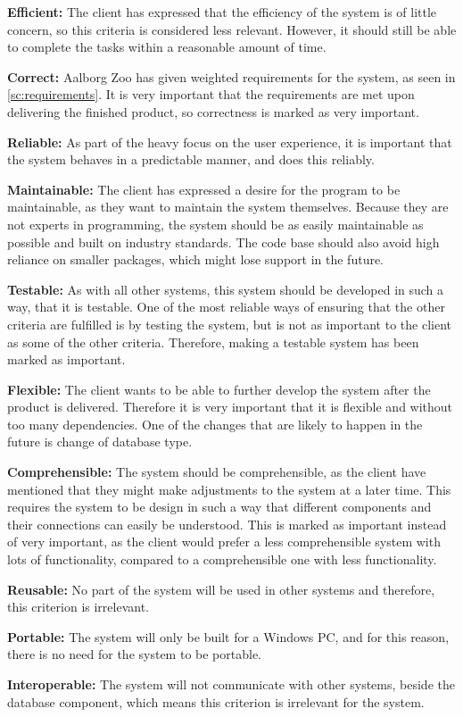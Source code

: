 \textbf{Efficient:} The client has expressed that the efficiency of the system is of little concern, so this criteria is considered less relevant. However, it should still be able to complete the tasks within a reasonable amount of time.

\textbf{Correct:} Aalborg Zoo has given weighted requirements for the system, as seen in \autoref{sc:requirements}. It is very important that the requirements are met upon delivering the finished product, so correctness is marked as very important.

\textbf{Reliable:} As part of the heavy focus on the user experience, it is important that the system behaves in a predictable manner, and does this reliably.

\textbf{Maintainable:} The client has expressed a desire for the program to be maintainable, as they want to maintain the system themselves. Because they are not experts in programming, the system should be as easily maintainable as possible and built on industry standards. The code base should also avoid high reliance on smaller packages, which might lose support in the future.

\textbf{Testable:} As with all other systems, this system should be developed in such a way, that it is testable. One of the most reliable ways of ensuring that the other criteria are fulfilled is by testing the system, but is not as important to the client as some of the other criteria. Therefore, making a testable system has been marked as important.

\textbf{Flexible:} The client wants to be able to further develop the system after the product is delivered. Therefore it is very important that it is flexible and without too many dependencies. One of the changes that are likely to happen in the future is change of database type.

\textbf{Comprehensible:} The system should be comprehensible, as the client have mentioned that they might make adjustments to the system at a later time. This requires the system to be design in such a way that different components and their connections can easily be understood. This is marked as important instead of very important, as the client would prefer a less comprehensible system with lots of functionality, compared to a comprehensible one with less functionality.

\textbf{Reusable:} No part of the system will be used in other systems and therefore, this criterion is irrelevant.

\textbf{Portable:} The system will only be built for a Windows PC, and for this reason, there is no need for the system to be portable. 

\textbf{Interoperable:} The system will not communicate with other systems, beside the database component, which means this criterion is irrelevant for the system.
